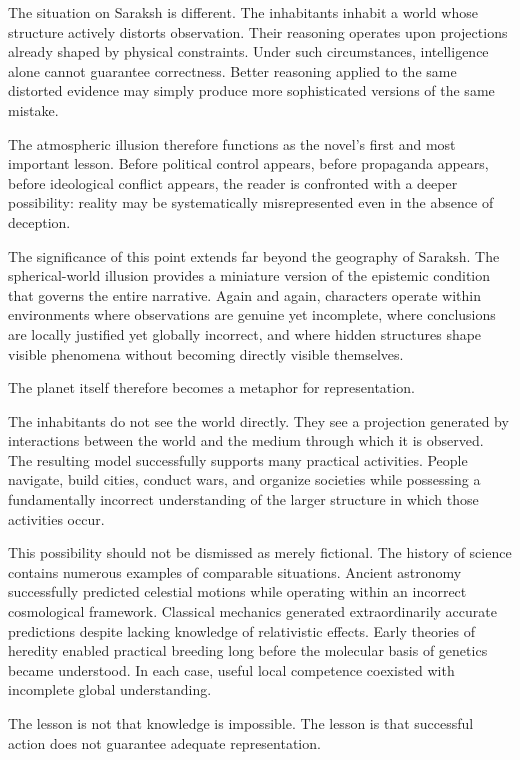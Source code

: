 \documentclass[12pt, a4paper]{article}
\theoremstyle{plain}
\theoremstyle{definition}
\theoremstyle{remark}
\begin{document}
The situation on Saraksh is different. The
inhabitants inhabit a world whose structure
actively distorts observation. Their reasoning
operates upon projections already shaped by
physical constraints. Under such circumstances,
intelligence alone cannot guarantee correctness.
Better reasoning applied to the same distorted
evidence may simply produce more sophisticated
versions of the same mistake.

The atmospheric illusion therefore functions as
the novel's first and most important lesson.
Before political control appears, before propaganda
appears, before ideological conflict appears, the
reader is confronted with a deeper possibility:
reality may be systematically misrepresented even
in the absence of deception.

The significance of this point extends far beyond
the geography of Saraksh. The spherical-world
illusion provides a miniature version of the
epistemic condition that governs the entire
narrative. Again and again, characters operate
within environments where observations are genuine
yet incomplete, where conclusions are locally
justified yet globally incorrect, and where hidden
structures shape visible phenomena without becoming
directly visible themselves.

The planet itself therefore becomes a metaphor
for representation.

The inhabitants do not see the world directly.
They see a projection generated by interactions
between the world and the medium through which
it is observed. The resulting model successfully
supports many practical activities. People
navigate, build cities, conduct wars, and organize
societies while possessing a fundamentally incorrect
understanding of the larger structure in which
those activities occur.

This possibility should not be dismissed as
merely fictional. The history of science contains
numerous examples of comparable situations.
Ancient astronomy successfully predicted celestial
motions while operating within an incorrect
cosmological framework. Classical mechanics
generated extraordinarily accurate predictions
despite lacking knowledge of relativistic effects.
Early theories of heredity enabled practical
breeding long before the molecular basis of
genetics became understood. In each case, useful
local competence coexisted with incomplete global
understanding.

The lesson is not that knowledge is impossible.
The lesson is that successful action does not
guarantee adequate representation.
\end{document}
